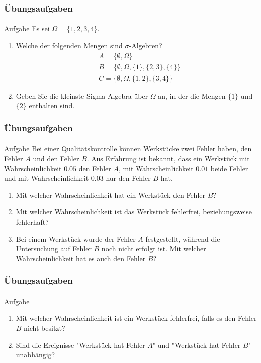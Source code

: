 \documentclass{beamer}
\begin{document}
\begin{frame}
    \frametitle{Übungsaufgaben}
\framesubtitle{}
\begin{block}{Aufgabe}
Es sei $\Omega = \{ 1,2,3,4\}$. 
\begin{enumerate}
\item Welche der folgenden Mengen sind $\sigma$-Algebren?
\begin{align*}
& A =  \{ \emptyset,  \Omega  \} \\
& B=  \{ \emptyset,  \Omega , \{ 1\}, \{ 2,3\}, \{ 4\} \}  \\
& C=  \{ \emptyset,  \Omega ,  \{ 1,2\}, \{ 3, 4\} \}  
\end{align*}
\item Geben Sie die kleinste Sigma-Algebra über $\Omega$ an, in der die Mengen $ \{ 1\}$ und $ \{ 2\}$ enthalten sind.
\end{enumerate}
\end{block}

 \end{frame}




\begin{frame}
    \frametitle{Übungsaufgaben}
\framesubtitle{}
\begin{block}{Aufgabe}
Bei einer Qualitätskontrolle können Werkstücke zwei Fehler haben, den Fehler $A$ und den Fehler $B$. Aus Erfahrung ist bekannt, dass ein Werkstück mit Wahrscheinlichkeit $0.05$  den Fehler $A$, mit Wahrscheinlichkeit $0.01$ beide Fehler und mit  Wahrscheinlichkeit $0.03$ nur den Fehler $B$ hat.
\begin{enumerate}
\item Mit welcher Wahrscheinlichkeit hat ein Werkstück den Fehler $B$?
\item Mit welcher Wahrscheinlichkeit ist das Werkstück fehlerfrei, beziehungsweise fehlerhaft?
\item Bei einem Werkstück wurde der Fehler $A$ festgestellt, während die Untersuchung auf Fehler $B$ noch nicht erfolgt ist. Mit welcher Wahrscheinlichkeit hat es auch den Fehler $B$?
\end{enumerate}
\end{block}
 \end{frame}

\begin{frame}
    \frametitle{Übungsaufgaben}
\framesubtitle{}
\begin{block}{Aufgabe}
\begin{enumerate}
\item Mit welcher Wahrscheinlichkeit ist ein Werkstück fehlerfrei, falls es den Fehler $B$ nicht besitzt?
\item Sind die Ereignisse "Werkstück hat Fehler $A$" und "Werkstück hat Fehler $B$" unabhängig?
\end{enumerate}
\end{block}
 \end{frame}
\end{document}
